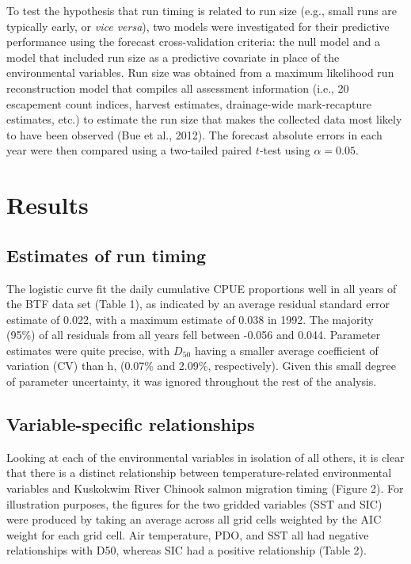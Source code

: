 \documentclass[12pt,]{book}
\theoremstyle{definition}
\theoremstyle{definition}
\theoremstyle{definition}
\theoremstyle{remark}
\begin{document}
To test the hypothesis that run timing is related to run size (e.g.,
small runs are typically early, or \emph{vice versa}), two models were
investigated for their predictive performance using the forecast
cross-validation criteria: the null model and a model that included run
size as a predictive covariate in place of the environmental variables.
Run size was obtained from a maximum likelihood run reconstruction model
that compiles all assessment information (i.e., 20 escapement count
indices, harvest estimates, drainage-wide mark-recapture estimates,
etc.) to estimate the run size that makes the collected data most likely
to have been observed (Bue et al., 2012). The forecast absolute errors
in each year were then compared using a two-tailed paired \(t\)-test
using \(\alpha = 0.05\).

\section{Results}\label{results}

\subsection{Estimates of run timing}\label{estimates-of-run-timing}

The logistic curve fit the daily cumulative CPUE proportions well in all
years of the BTF data set (Table 1), as indicated by an average residual
standard error estimate of 0.022, with a maximum estimate of 0.038 in
1992. The majority (95\%) of all residuals from all years fell between
-0.056 and 0.044. Parameter estimates were quite precise, with \(D_50\)
having a smaller average coefficient of variation (CV) than h, (0.07\%
and 2.09\%, respectively). Given this small degree of parameter
uncertainty, it was ignored throughout the rest of the analysis.

\subsection{Variable-specific
relationships}\label{variable-specific-relationships}

Looking at each of the environmental variables in isolation of all
others, it is clear that there is a distinct relationship between
temperature-related environmental variables and Kuskokwim River Chinook
salmon migration timing (Figure 2). For illustration purposes, the
figures for the two gridded variables (SST and SIC) were produced by
taking an average across all grid cells weighted by the AIC weight for
each grid cell. Air temperature, PDO, and SST all had negative
relationships with D50, whereas SIC had a positive relationship (Table
2).
\end{document}
